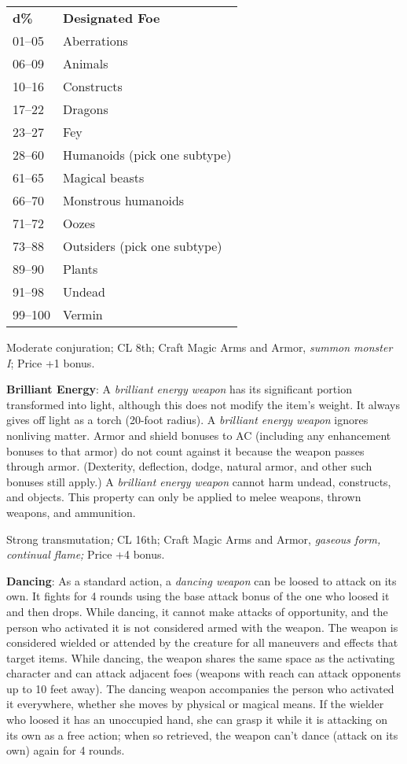 \begin{tabular}{ll}
\textbf{d\%} & \textbf{Designated Foe}      \\
01–05        & Aberrations                  \\
06–09        & Animals                      \\
10–16        & Constructs                   \\
17–22        & Dragons                      \\
23–27        & Fey                          \\
28–60        & Humanoids (pick one subtype) \\
61–65        & Magical beasts               \\
66–70        & Monstrous humanoids          \\
71–72        & Oozes                        \\
73–88        & Outsiders (pick one subtype) \\
89–90        & Plants                       \\
91–98        & Undead                       \\
99–100       & Vermin                      \\
\end{tabular}
				
Moderate conjuration; CL 8th; Craft Magic Arms and Armor, \textit{summon monster I}; Price +1 bonus.
				
\textbf{Brilliant Energy}: A \textit{brilliant energy weapon} has its significant portion transformed into light, although this does not modify the item's weight. It always gives off light as a torch (20-foot radius). A \textit{brilliant energy weapon} ignores nonliving matter. Armor and shield bonuses to AC (including any enhancement bonuses to that armor) do not count against it because the weapon passes through armor. (Dexterity, deflection, dodge, natural armor, and other such bonuses still apply.) A \textit{brilliant energy weapon} cannot harm undead, constructs, and objects. This property can only be applied to melee weapons, thrown weapons, and ammunition.
				
Strong transmutation\textit{; }CL 16th; Craft Magic Arms and Armor, \textit{gaseous form, continual flame; }Price +4 bonus.
				
\textbf{Dancing}: As a standard action, a \textit{dancing weapon }can be loosed to attack on its own. It fights for 4 rounds using the base attack bonus of the one who loosed it and then drops. While dancing, it cannot make attacks of opportunity, and the person who activated it is not considered armed with the weapon. The weapon is considered wielded or attended by the creature for all maneuvers and effects that target items. While dancing, the weapon shares the same space as the activating character and can attack adjacent foes (weapons with reach can attack opponents up to 10 feet away). The dancing weapon accompanies the person who activated it everywhere, whether she moves by physical or magical means. If the wielder who loosed it has an unoccupied hand, she can grasp it while it is attacking on its own as a free action; when so retrieved, the weapon can't dance (attack on its own) again for 4 rounds.
				
